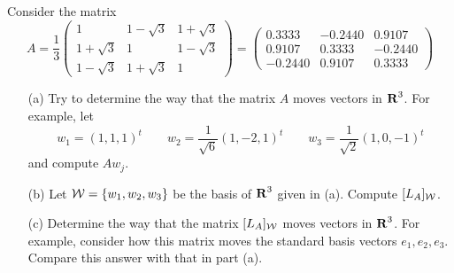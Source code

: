 \begin{exercise}  \label{c7.5.A}
Consider the matrix
\begin{equation*}
A = \frac{1}{3}\left(\begin{array}{ccc}
	1 & 1-\sqrt{3} & 1+\sqrt{3} \\
	1+\sqrt{3} & 1 & 1-\sqrt{3} \\
	1-\sqrt{3} & 1+\sqrt{3} & 1
	\end{array}\right)
  =  \left(\begin{array}{rrr}
    0.3333  & -0.2440  &  0.9107\\
    0.9107  &  0.3333  & -0.2440\\
   -0.2440  &  0.9107  &  0.3333
 \end{array}\right)
\end{equation*}
\begin{itemize}
\item[(a)]  Try to determine the way that the matrix $A$ moves vectors
in $\mbox{$\bf{R}$}^3$.  For example, let
\[
w_1=(1,1,1)^t \qquad w_2 = \frac{1}{\sqrt{6}}(1,-2,1)^t \qquad w_3 =
\frac{1}{\sqrt{2}}(1,0,-1)^t
\]
and compute $Aw_j$.
\item[(b)]  Let ${\cal W} = \{w_1,w_2,w_3\}$ be the basis of $\mbox{$\bf{R}$}^3$ given
in (a).  Compute $[L_A]_{\cal W}$.
\item[(c)]  Determine the way that the matrix $[L_A]_{\cal W}$ moves 
vectors in $\mbox{$\bf{R}$}^3$.  For example, consider how this matrix moves the standard 
basis vectors $e_1,e_2,e_3$.  Compare this answer with that in part (a).
\end{itemize}
\end{exercise}

